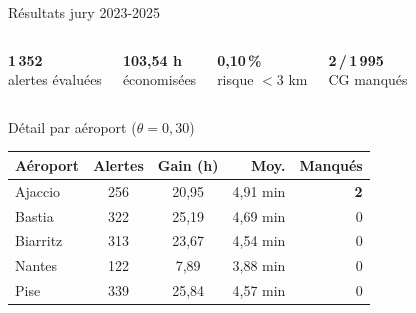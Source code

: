 \documentclass[aspectratio=169,t,11pt]{beamer}
\begin{document}
\begin{frame}[shrink=10]{Résultats jury 2023-2025}
\vspace{-4pt}
\begin{columns}[c]
\begin{tcolorbox}[mybox,colback=metMid!10,colframe=metMid,
  halign=center,top=4pt,bottom=4pt]
{\large\bfseries\color{metMid}1\,352}\\[1pt]
\small alertes évaluées
\end{tcolorbox}
\begin{tcolorbox}[mybox,colback=metGreen!10,colframe=metGreen,
  halign=center,top=4pt,bottom=4pt]
{\large\bfseries\color{metGreen}103,54 h}\\[1pt]
\small économisées
\end{tcolorbox}
\begin{tcolorbox}[mybox,colback=metGreen!10,colframe=metGreen,
  halign=center,top=4pt,bottom=4pt]
{\large\bfseries\color{metGreen}0,10\,\%}\\[1pt]
\small risque $<$3 km
\end{tcolorbox}
\begin{tcolorbox}[mybox,colback=metGreen!10,colframe=metGreen,
  halign=center,top=4pt,bottom=4pt]
{\large\bfseries\color{metGreen}2\,/\,1\,995}\\[1pt]
\small CG manqués
\end{tcolorbox}
\end{columns}

\vspace{3pt}
\begin{columns}[T]
\begin{block}{Détail par aéroport ($\theta=0{,}30$)}
\scriptsize
\begin{tabular}{lccrr}
\toprule
\textbf{Aéroport} & \textbf{Alertes} & \textbf{Gain (h)} & \textbf{Moy.} & \textbf{Manqués} \\
\midrule
Ajaccio  & 256 & 20,95 & 4,91 min & \textbf{\color{metRed}2} \\
Bastia   & 322 & 25,19 & 4,69 min & 0 \\
Biarritz & 313 & 23,67 & 4,54 min & 0 \\
Nantes   & 122 &  7,89 & 3,88 min & 0 \\
Pise     & 339 & 25,84 & 4,57 min & 0 \\
\bottomrule
\end{tabular}
\end{block}


\end{columns}
\end{frame}
\end{document}
